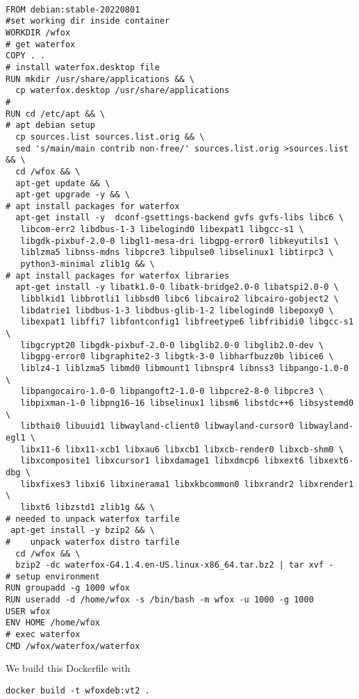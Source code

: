 \documentclass[a4paper]{article}  %
\begin{document}
\begin{tcolorbox}
\begin{verbatim}

FROM debian:stable-20220801
#set working dir inside container
WORKDIR /wfox
# get waterfox
COPY . .
# install waterfox.desktop file
RUN mkdir /usr/share/applications && \
  cp waterfox.desktop /usr/share/applications
#
RUN cd /etc/apt && \
# apt debian setup
  cp sources.list sources.list.orig && \
  sed 's/main/main contrib non-free/' sources.list.orig >sources.list && \
  cd /wfox && \
  apt-get update && \
  apt-get upgrade -y && \
# apt install packages for waterfox
  apt-get install -y  dconf-gsettings-backend gvfs gvfs-libs libc6 \
   libcom-err2 libdbus-1-3 libelogind0 libexpat1 libgcc-s1 \
   libgdk-pixbuf-2.0-0 libgl1-mesa-dri libgpg-error0 libkeyutils1 \
   liblzma5 libnss-mdns libpcre3 libpulse0 libselinux1 libtirpc3 \
   python3-minimal zlib1g && \
# apt install packages for waterfox libraries
  apt-get install -y libatk1.0-0 libatk-bridge2.0-0 libatspi2.0-0 \
   libblkid1 libbrotli1 libbsd0 libc6 libcairo2 libcairo-gobject2 \
   libdatrie1 libdbus-1-3 libdbus-glib-1-2 libelogind0 libepoxy0 \
   libexpat1 libffi7 libfontconfig1 libfreetype6 libfribidi0 libgcc-s1 \
   libgcrypt20 libgdk-pixbuf-2.0-0 libglib2.0-0 libglib2.0-dev \ 
   libgpg-error0 libgraphite2-3 libgtk-3-0 libharfbuzz0b libice6 \
   liblz4-1 liblzma5 libmd0 libmount1 libnspr4 libnss3 libpango-1.0-0 \
   libpangocairo-1.0-0 libpangoft2-1.0-0 libpcre2-8-0 libpcre3 \
   libpixman-1-0 libpng16-16 libselinux1 libsm6 libstdc++6 libsystemd0 \
   libthai0 libuuid1 libwayland-client0 libwayland-cursor0 libwayland-egl1 \
   libx11-6 libx11-xcb1 libxau6 libxcb1 libxcb-render0 libxcb-shm0 \
   libxcomposite1 libxcursor1 libxdamage1 libxdmcp6 libxext6 libxext6-dbg \
   libxfixes3 libxi6 libxinerama1 libxkbcommon0 libxrandr2 libxrender1 \
   libxt6 libzstd1 zlib1g && \
# needed to unpack waterfox tarfile
 apt-get install -y bzip2 && \
#    unpack waterfox distro tarfile
  cd /wfox && \
  bzip2 -dc waterfox-G4.1.4.en-US.linux-x86_64.tar.bz2 | tar xvf -
# setup environment
RUN groupadd -g 1000 wfox
RUN useradd -d /home/wfox -s /bin/bash -m wfox -u 1000 -g 1000
USER wfox
ENV HOME /home/wfox
# exec waterfox
CMD /wfox/waterfox/waterfox
\end{verbatim}
\end{tcolorbox}
We build this Dockerfile with
\begin{tcolorbox}
\begin{verbatim}
docker build -t wfoxdeb:vt2 .
\end{verbatim}
\end{tcolorbox}
\end{document}
